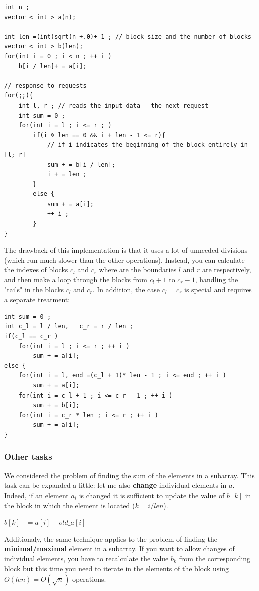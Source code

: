 \begin{verbatim}
int n ;
vector < int > a(n);
 
int len =(int)sqrt(n +.0)+ 1 ; // block size and the number of blocks
vector < int > b(len);
for(int i = 0 ; i < n ; ++ i )
    b[i / len]+ = a[i];
 
// response to requests
for(;;){
    int l, r ; // reads the input data - the next request
    int sum = 0 ;
    for(int i = l ; i <= r ; )
        if(i % len == 0 && i + len - 1 <= r){
            // if i indicates the beginning of the block entirely in [l; r]
            sum + = b[i / len];
            i + = len ;
        }
        else {
            sum + = a[i];
            ++ i ;
        }
} 
\end{verbatim}
The drawback of this implementation is that it uses a lot of unneeded divisions (which run much slower than the other operations). Instead, you can calculate the indexes of blocks $c_l$ and $c_r$ where are the boundaries $l$ and $r$ are respectively, and then make a loop through the blocks from $c_l +1$ to $c_r-1$, handling the "tails" in the blocks $c_l$ and $c_r$. In addition, the case $c_l = c_r$ is special and requires a separate treatment:

\begin{verbatim}
int sum = 0 ;
int c_l = l / len,   c_r = r / len ;
if(c_l == c_r )
    for(int i = l ; i <= r ; ++ i )
        sum + = a[i];
else {
    for(int i = l, end =(c_l + 1)* len - 1 ; i <= end ; ++ i )
        sum + = a[i];
    for(int i = c_l + 1 ; i <= c_r - 1 ; ++ i )
        sum + = b[i];
    for(int i = c_r * len ; i <= r ; ++ i )
        sum + = a[i];
} 
\end{verbatim}
\subsubsection{ Other tasks }

We considered the problem of finding the sum of the elements in a subarray. This task can be expanded a little: let me also \textbf{change} individual elements in $a$. Indeed, if an element $a_i$ is changed it is sufficient to update the value of $b [k]$ in the block in which the element is located ($k = i / len$).

$b [k] + = a [i] - old \_a [i]$

Additionaly, the same technique applies to the problem of finding the \textbf{minimal/maximal} element in a subarray. If you want to allow changes of individual elements, you have to recalculate the value $b_k$ from the corresponding block but this time you need to iterate in the elements of the block using $O (len) = O (\sqrt {n})$ operations.


